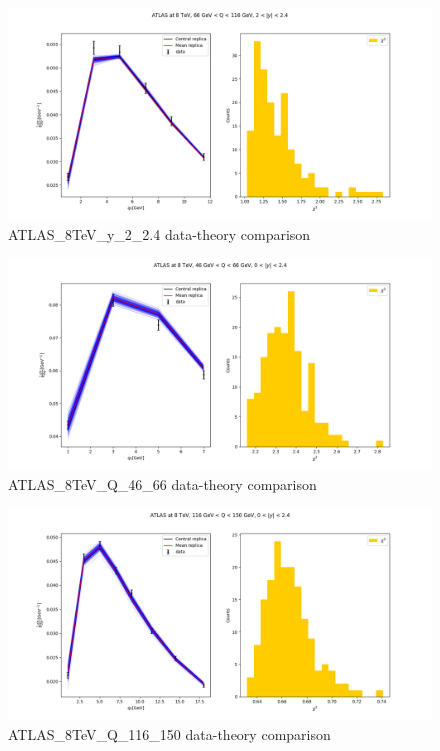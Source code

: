 \documentclass[
]{article}
\begin{document}
\begin{figure}
\centering
\includegraphics{pngplots/ATLAS_8TeV_y_2_2.4.png}
\caption{ATLAS\_8TeV\_y\_2\_2.4 data-theory comparison}
\end{figure}

\begin{figure}
\centering
\includegraphics{pngplots/ATLAS_8TeV_Q_46_66.png}
\caption{ATLAS\_8TeV\_Q\_46\_66 data-theory comparison}
\end{figure}

\begin{figure}
\centering
\includegraphics{pngplots/ATLAS_8TeV_Q_116_150.png}
\caption{ATLAS\_8TeV\_Q\_116\_150 data-theory comparison}
\end{figure}
\end{document}
